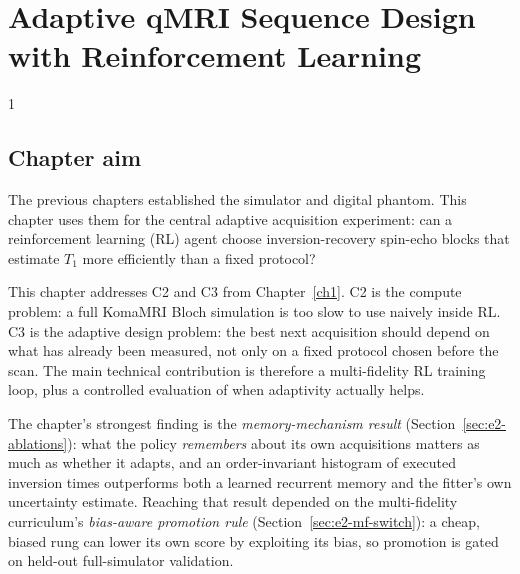 \chapter{Adaptive qMRI Sequence Design with Reinforcement Learning}
\label{ch:adaptive-rl}

\begin{spacing}{1} %
\minitoc %
\end{spacing} %
\thesisspacing %

\setlength{\textfloatsep}{9pt plus 2pt minus 2pt}
\setlength{\floatsep}{7pt plus 2pt minus 2pt}
\setlength{\intextsep}{7pt plus 2pt minus 2pt}
\setlength{\abovecaptionskip}{3pt}
\setlength{\belowcaptionskip}{0pt}

\section{Chapter aim}
\label{sec:e2-chapter-aim}

The previous chapters established the simulator and digital phantom. This
chapter uses them for the central adaptive acquisition experiment: can a
reinforcement learning (RL) agent choose inversion-recovery spin-echo blocks
that estimate $T_1$ more efficiently than a fixed protocol?

This chapter addresses C2 and C3 from Chapter~\ref{ch1}. C2 is the compute
problem: a full KomaMRI Bloch simulation is too slow to use naively inside RL.
C3 is the adaptive design problem: the best next acquisition should depend on
what has already been measured, not only on a fixed protocol chosen before the
scan. The main technical contribution is therefore a multi-fidelity RL training
loop, plus a controlled evaluation of when adaptivity actually helps.

The chapter's strongest finding is the \emph{memory-mechanism result}
(Section~\ref{sec:e2-ablations}): what the policy \emph{remembers} about its own
acquisitions matters as much as whether it adapts, and an order-invariant
histogram of executed inversion times outperforms both a learned recurrent
memory and the fitter's own uncertainty estimate. Reaching that result depended
on the multi-fidelity curriculum's \emph{bias-aware promotion rule}
(Section~\ref{sec:e2-mf-switch}): a cheap, biased rung can lower its own score by
exploiting its bias, so promotion is gated on held-out full-simulator validation.

